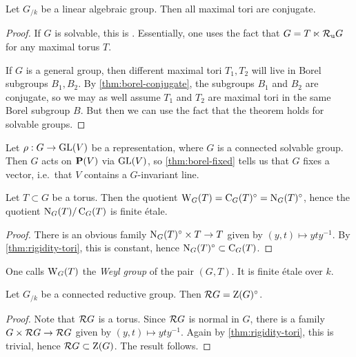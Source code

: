 \begin{theorem}
Let $G_{/k}$ be a linear algebraic group. Then all maximal tori are conjugate. 
\end{theorem}
\begin{proof}
If $G$ is solvable, this is \cite[17.40]{milne-iAG}. Essentially, one uses 
the fact that $G=T\ltimes \mathcal{R}_\mathrm{u} G$ for any maximal torus $T$. 

If $G$ is a general group, then different maximal tori $T_1,T_2$ will live in 
Borel subgroups $B_1,B_2$. By \autoref{thm:borel-conjugate}, the subgroups 
$B_1$ and $B_2$ are conjugate, so we may as well assume $T_1$ and $T_2$ are 
maximal tori in the same Borel subgroup $B$. But then we can use the fact that 
the theorem holds for solvable groups. 
\end{proof}

\begin{example}
Let $\rho:G\to \operatorname{GL}(V)$ be a representation, where $G$ is a connected 
solvable group. Then $G$ acts on $\mathbf{P}(V)$ via $\operatorname{GL}(V)$, so 
\autoref{thm:borel-fixed} tells us that $G$ fixes a vector, i.e.~that 
$V$ contains a $G$-invariant line. 
\end{example}

\begin{lemma}
Let $T\subset G$ be a torus. Then the quotient 
$\operatorname{W}_G(T)=\operatorname{C}_G(T)^\circ=\operatorname{N}_G(T)^\circ$, hence the quotient 
$\operatorname{N}_G(T)/\operatorname{C}_G(T)$ is finite \'etale. 
\end{lemma}
\begin{proof}
There is an obvious family $\operatorname{N}_G(T)^\circ\times T\to T$ given by 
$(y,t)\mapsto y t y^{-1}$. By \autoref{thm:rigidity-tori}, this is constant, 
hence $\operatorname{N}_G(T)^\circ\subset \operatorname{C}_G(T)$. 
\end{proof}

One calls $\operatorname{W}_G(T)$ the \emph{Weyl group} of the pair $(G,T)$. It is finite 
\'etale over $k$. 

\begin{lemma}
Let $G_{/k}$ be a connected reductive group. Then $\mathcal{R} G=\operatorname{Z}(G)^\circ$. 
\end{lemma}
\begin{proof}
Note that $\mathcal{R} G$ is a torus. Since $\mathcal{R} G$ is normal in $G$, there is a 
family $G\times \mathcal{R} G\to \mathcal{R} G$ given by $(y,t)\mapsto y t y^{-1}$. Again 
by \autoref{thm:rigidity-tori}, this is trivial, hence 
$\mathcal{R} G\subset \operatorname{Z}(G)$. The result follows. 
\end{proof}

